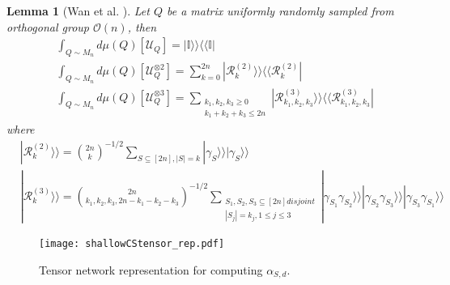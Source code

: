 \documentclass{article}
\newcommand{\abs}[1]{\left| #1 \right|}
\newcommand{\sbra}[1]{\left[ #1 \right]}
\newcommand{\supket}[1]{|#1 \rangle\rangle}
\newcommand{\supbra}[1]{\langle\langle #1 |}
\newcommand{\tr}[1]{\text{Tr}\left( #1 \right)}
\newtheorem{lemma}{Lemma}
\newcommand{\Ucal}{\mathcal{U}}
\newcommand{\Ocal}{\mathcal{O}}
\newcommand{\Mcal}{\mathcal{M}}
\newcommand{\Rcal}{\mathcal{R}}
\newcommand{\Ibb}{\mathbb{I}}
\begin{document}
\begin{lemma}[Wan et al. \cite{wan2022matchgate}]
Let $Q$ be a matrix uniformly randomly sampled from orthogonal group $\Ocal(n)$, then
\begin{align}
& \int_{Q\sim M_n} d\mu(Q)\sbra{\Ucal_Q} = \supket{\Ibb}\supbra{\Ibb}\\
& \int_{Q\sim M_n} d\mu(Q)\sbra{\Ucal_Q^{\otimes 2}} = \sum_{k=0}^{2n}\supket{\Rcal_k^{(2)}}\supbra{\Rcal_k^{(2)}}\\
& \int_{Q\sim M_n} d\mu(Q)\sbra{\Ucal_Q^{\otimes 3}} = \sum_{
\substack{
k_1,k_2,k_3\geq 0\\
k_1 + k_2 + k_3\leq 2n
}
}\supket{\Rcal_{k_1,k_2,k_3}^{(3)}}\supbra{\Rcal_{k_1,k_2,k_3}^{(3)}}
\end{align}
where
\begin{align}
    &\supket{\Rcal_k^{(2)}} = { 2n\choose k}^{-1/2} \sum_{S\subseteq [2n],|S|=k}\supket{\gamma_S}\supket{\gamma_S}\\
    &\supket{\Rcal_k^{(3)}} = {2n \choose k_1,k_2,k_3,2n-k_1-k_2-k_3}^{-1/2} \sum_{
    \substack{
 S_1, S_2, S_3\subseteq [2n] disjoint\\
 \abs{S_j}=k_j,1\leq j\leq 3
    }
    } \supket{\gamma_{S_1}\gamma_{S_2}}
    \supket{\gamma_{S_2}\gamma_{S_3}}
    \supket{\gamma_{S_3}\gamma_{S_1}}
\label{eq:third_moment}
\end{align}
\label{lem:threemomentsMatchgate}
\end{lemma}

     
\begin{figure}
    \centering
    \texttt{[image: shallowCStensor\_rep.pdf]}
    \caption{Tensor network representation for computing $\alpha_{S,d}$.}
    \label{fig:TNcoefRep}
\end{figure}

\end{document}
